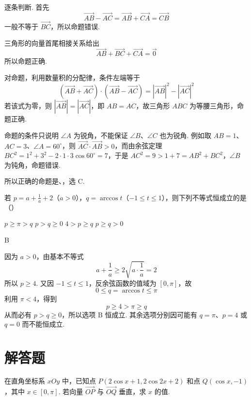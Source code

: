 \begin{solution}
逐条判断. 首先
\[
\overrightarrow{AB}-\overrightarrow{AC}
=\overrightarrow{AB}+\overrightarrow{CA}
=\overrightarrow{CB}
\]
一般不等于 \(\overrightarrow{BC}\)，所以命题错误.

三角形的向量首尾相接关系给出
\[
\overrightarrow{AB}+\overrightarrow{BC}+\overrightarrow{CA}=\overrightarrow{0}
\]
所以命题正确.

对命题，利用数量积的分配律，条件左端等于
\[
(\overrightarrow{AB}+\overrightarrow{AC})\cdot(\overrightarrow{AB}-\overrightarrow{AC})
=|\overrightarrow{AB}|^2-|\overrightarrow{AC}|^2
\]
若该式为零，则 \(|\overrightarrow{AB}|=|\overrightarrow{AC}|\)，即 \(AB=AC\)，故三角形 \(ABC\) 为等腰三角形，命题正确.

命题的条件只说明 \(\angle A\) 为锐角，不能保证 \(\angle B\)、\(\angle C\) 也为锐角. 例如取 \(AB=1\)、\(AC=3\)、\(\angle A=60^{\circ}\)，则 \(\overrightarrow{AC}\cdot\overrightarrow{AB}>0\)，而由余弦定理 \(BC^2=1^2+3^2-2\cdot1\cdot3\cos60^{\circ}=7\)，于是 \(AC^2=9>1+7=AB^2+BC^2\)，\(\angle B\) 为钝角，命题错误.

所以正确的命题是、，选 C.
\end{solution}

\begin{problem}
若 \(p = a + \frac{1}{a} + 2\)（\(a>0\)），\(q = \arccos t\)（\(-1 \leqslant t \leqslant 1\)），则下列不等式恒成立的是（\quad）

\choices
    {\(p \geqslant \pi > q\)}
    {\(p > q \geqslant 0\)}
    {\(4 > p \geqslant q\)}
    {\(p \geqslant q > 0\)}
\end{problem}

\begin{answer}
B
\end{answer}

\begin{solution}
因为 \(a>0\)，由基本不等式
\[
a+\frac{1}{a}\geqslant2\sqrt{a\cdot\frac{1}{a}}=2
\]
所以 \(p\geqslant4\). 又因 \(-1\leqslant t\leqslant1\)，反余弦函数的值域为 \([0,\pi]\)，故
\[
0\leqslant q=\arccos t\leqslant\pi
\]
利用 \(\pi<4\)，得到
\[
p\geqslant4>\pi\geqslant q
\]
从而必有 \(p>q\geqslant0\)，所以选项 B 恒成立. 其余选项分别因可能有 \(q=\pi\)、\(p=4\) 或 \(q=0\) 而不能恒成立.
\end{solution}

\section{解答题}
\begin{problem}
在直角坐标系 \(xOy\) 中，已知点 \(P(2\cos x+1, 2\cos 2x+2)\) 和点 \(Q(\cos x,-1)\)，其中 \(x \in [0,\pi]\). 若向量 \(\overrightarrow{OP}\) 与 \(\overrightarrow{OQ}\) 垂直，求 \(x\) 的值.
\end{problem}

